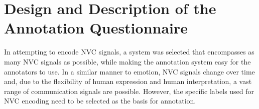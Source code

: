 \section{Design and Description of the Annotation Questionnaire}
\label{SectionSelectionOfNvcCategories}
\label{SectionDescribeQuestions}


In attempting to encode \ac{NVC} signals, a system was selected that encompasses as many \ac{NVC} signals as possible, while making the annotation system easy for the annotators to use. In a similar manner to emotion, \ac{NVC} signals change over time and, due to the flexibility of human expression and human interpretation, a vast range of communication signals are possible. 
However, the specific labels used for \ac{NVC} encoding need to be selected as the basis for annotation. 



